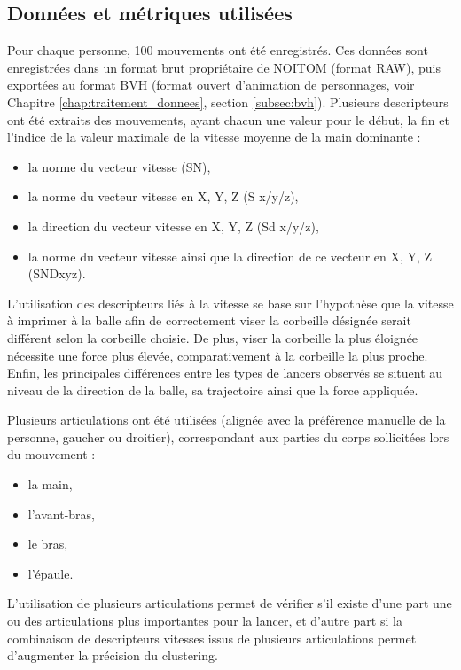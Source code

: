 \subsection{Données et métriques utilisées}
Pour chaque personne, 100 mouvements ont été enregistrés. Ces données sont enregistrées dans un format brut propriétaire de NOITOM (format RAW), puis exportées au format BVH (format ouvert d'animation de personnages, voir Chapitre \ref{chap:traitement_donnees}, section \ref{subsec:bvh}). Plusieurs descripteurs ont été extraits des mouvements, ayant chacun une valeur pour le début, la fin et l'indice de la valeur maximale de la vitesse moyenne de la main dominante :
\begin{itemize}
	\item la norme du vecteur vitesse (SN),
	\item la norme du vecteur vitesse en X, Y, Z (S x/y/z),
	\item la direction du vecteur vitesse en X, Y, Z (Sd x/y/z),
	\item la norme du vecteur vitesse ainsi que la direction de ce vecteur en X, Y, Z (SNDxyz).
\end{itemize}

L'utilisation des descripteurs liés à la vitesse se base sur l'hypothèse que la vitesse à imprimer à la balle afin de correctement viser la corbeille désignée serait différent selon la corbeille choisie. De plus, viser la corbeille la plus éloignée nécessite une force plus élevée, comparativement à la corbeille la plus proche. Enfin, les principales différences entre les types de lancers observés se situent au niveau de la direction de la balle, sa trajectoire ainsi que la force appliquée.

Plusieurs articulations ont été utilisées (alignée avec la préférence manuelle de la personne, gaucher ou droitier), correspondant aux parties du corps sollicitées lors du mouvement :
\begin{itemize}
	\item la main,
	\item l'avant-bras,
	\item le bras,
	\item l'épaule.
\end{itemize}
L'utilisation de plusieurs articulations permet de vérifier s'il existe d'une part une ou des articulations plus importantes pour la lancer, et d'autre part si la combinaison de descripteurs vitesses issus de plusieurs articulations permet d'augmenter la précision du clustering.

